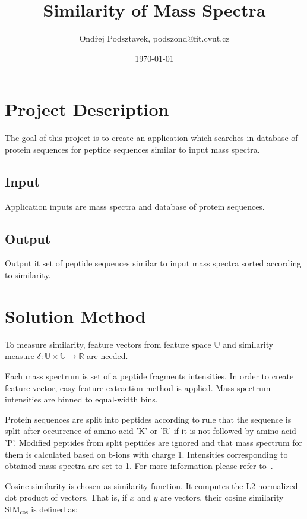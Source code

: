 \documentclass[a4paper,10pt,twocolumn]{article}
\title{Similarity of Mass Spectra}
\date{\today}
\author{Ondřej Podsztavek, podszond@fit.cvut.cz}
\begin{document}
\maketitle

\section{Project Description}

The goal of this project is to create an application which searches
in database of protein sequences for peptide sequences similar to input
mass spectra.

\subsection{Input}

Application inputs are mass spectra and database of protein
sequences.

\subsection{Output}

Output it set of peptide sequences similar to input mass
spectra sorted according to similarity.

\section{Solution Method}

To measure similarity, feature vectors from feature space \(\mathbb{U}\)
and similarity measure \(\delta: \mathbb{U} \times \mathbb{U} \to \mathbb{R}\)
are needed.

Each mass spectrum is set of a peptide fragments intensities. In order to create
feature vector, easy feature extraction method is applied. Mass spectrum
intensities are binned to equal-width bins.

Protein sequences are split into peptides according to rule that the
sequence is split after occurrence of amino acid 'K' or 'R' if it is not
followed by amino acid 'P'. Modified peptides from split peptides are
ignored and that mass spectrum for them is calculated based on b-ions with
charge 1. Intensities corresponding to obtained mass spectra are set to 1.
For more information please refer to~\cite{novak2009}.

Cosine similarity is chosen as similarity function. It computes the
L2-normalized dot product of vectors. That is, if \(x\) and \(y\) are vectors,
their cosine similarity \(\text{SIM}_{\cos}\) is defined as:
\end{document}
